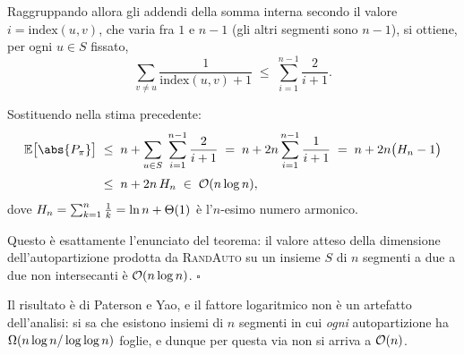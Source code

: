 Raggruppando allora gli addendi della somma interna secondo il valore $i=\mathrm{index}(u,v)$,
che varia fra $1$ e $n-1$ (gli altri segmenti sono $n-1$), si ottiene, per ogni $u\in S$
fissato,
\[
  \sum_{v\neq u}\frac{1}{\mathrm{index}(u,v)+1}\;\le\;\sum_{i=1}^{n-1}\frac{2}{i+1}.
\]

Sostituendo nella stima precedente:
\begin{align*}
  \E\bigl[\abs{P_\pi}\bigr]
    &\;\le\; n+\sum_{u\in S}\;\sum_{i=1}^{n-1}\frac{2}{i+1}
     \;=\; n+2n\sum_{i=1}^{n-1}\frac{1}{i+1}
     \;=\; n+2n\bigl(H_n-1\bigr)\\[2pt]
    &\;\le\; n+2n\,H_n\;\in\;\Oh(n\log n),
\end{align*}
dove $H_n=\sum_{k=1}^{n}\frac{1}{k}=\ln n+\Theta(1)$ è l'$n$-esimo numero armonico.

Questo è esattamente l'enunciato del teorema: il valore atteso della dimensione
dell'autopartizione prodotta da \textsc{RandAuto} su un insieme $S$ di $n$ segmenti a due a
due non intersecanti è $\mathcal{O}(n\log n)$.
\hfill$\square$

\begin{osservazione}
Il risultato è di Paterson e Yao, e il fattore logaritmico non è un artefatto dell'analisi:
si sa che esistono insiemi di $n$ segmenti in cui \emph{ogni} autopartizione ha
$\Omega(n\log n/\log\log n)$ foglie, e dunque per questa via non si arriva a $\mathcal{O}(n)$.
\end{osservazione}
